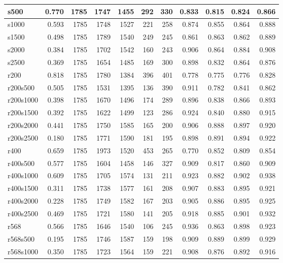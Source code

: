 \begin{table}
{\begin{tabular}{|l|r|r|r|r|r|r|r|r|r|r|}
s500         & 0.770 & 1785 & 1747 & 1455 & 292 & 330 & 0.833 & 0.815 & 0.824 & 0.866 \\ \hline
s1000        & 0.593 & 1785 & 1748 & 1527 & 221 & 258 & 0.874 & 0.855 & 0.864 & 0.888 \\ \hline
s1500        & 0.498 & 1785 & 1789 & 1540 & 249 & 245 & 0.861 & 0.863 & 0.862 & 0.889 \\ \hline
s2000        & 0.384 & 1785 & 1702 & 1542 & 160 & 243 & 0.906 & 0.864 & 0.884 & 0.908 \\ \hline
s2500        & 0.369 & 1785 & 1654 & 1485 & 169 & 300 & 0.898 & 0.832 & 0.864 & 0.876 \\ \hline
r200         & 0.818 & 1785 & 1780 & 1384 & 396 & 401 & 0.778 & 0.775 & 0.776 & 0.828 \\ \hline
r200s500     & 0.505 & 1785 & 1531 & 1395 & 136 & 390 & 0.911 & 0.782 & 0.841 & 0.862 \\ \hline
r200s1000    & 0.398 & 1785 & 1670 & 1496 & 174 & 289 & 0.896 & 0.838 & 0.866 & 0.893 \\ \hline
r200s1500    & 0.392 & 1785 & 1622 & 1499 & 123 & 286 & 0.924 & 0.840 & 0.880 & 0.915 \\ \hline
r200s2000    & 0.441 & 1785 & 1750 & 1585 & 165 & 200 & 0.906 & 0.888 & 0.897 & 0.920 \\ \hline
r200s2500    & 0.180 & 1785 & 1771 & 1590 & 181 & 195 & 0.898 & 0.891 & 0.894 & 0.922 \\ \hline
r400         & 0.659 & 1785 & 1973 & 1520 & 453 & 265 & 0.770 & 0.852 & 0.809 & 0.854 \\ \hline
r400s500     & 0.577 & 1785 & 1604 & 1458 & 146 & 327 & 0.909 & 0.817 & 0.860 & 0.909 \\ \hline
r400s1000    & 0.609 & 1785 & 1705 & 1574 & 131 & 211 & 0.923 & 0.882 & 0.902 & 0.938 \\ \hline
r400s1500    & 0.311 & 1785 & 1738 & 1577 & 161 & 208 & 0.907 & 0.883 & 0.895 & 0.921 \\ \hline
r400s2000    & 0.228 & 1785 & 1749 & 1582 & 167 & 203 & 0.905 & 0.886 & 0.895 & 0.925 \\ \hline
r400s2500    & 0.469 & 1785 & 1721 & 1580 & 141 & 205 & 0.918 & 0.885 & 0.901 & 0.932 \\ \hline
r568         & 0.566 & 1785 & 1646 & 1540 & 106 & 245 & 0.936 & 0.863 & 0.898 & 0.923 \\ \hline
r568s500     & 0.195 & 1785 & 1746 & 1587 & 159 & 198 & 0.909 & 0.889 & 0.899 & 0.929 \\ \hline
r568s1000    & 0.350 & 1785 & 1723 & 1564 & 159 & 221 & 0.908 & 0.876 & 0.892 & 0.916 \\ \hline

\end{tabular}}
\end{table}

